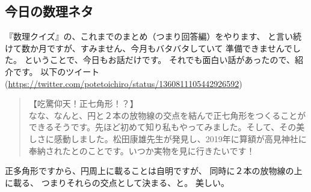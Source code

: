 \documentclass[dvipdfmx,autodetect-engine,10pt,b5paper,papersize,openany,dvipsnames]{jsbook}
\begin{document}
\begin{multicols}{2}

\vspace{15cm}

\section{今日の数理ネタ}
『数理クイズ』の、これまでのまとめ（つまり回答編）をやります、
と言い続けて数か月ですが、すみません、今月もバタバタしていて
準備できませんでした。
ということで、今日もお話だけです。
それでも面白い話があったので、紹介です。
以下のツイート
(\url{https://twitter.com/potetoichiro/status/1360811105442926592})
\begin{quotation}
  \noindent
  【吃驚仰天！正七角形！？】\\
  なな、なんと、円と２本の放物線の交点を結んで正七角形をつくることができるそうです。先ほど初めて知り私もやってみました。そして、その美しさに感動しました。松田康雄先生が発見し、2019年に算額が高見神社に奉納されたとのことです。いつか実物を見に行きたいです！
\end{quotation}
正多角形ですから、円周上に載ることは自明ですが、
同時に２本の放物線の上に載る、
つまりそれらの交点として決まる、と。
美しい。


\end{multicols}
\end{document}
